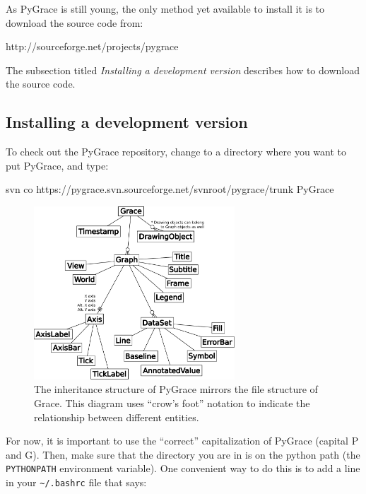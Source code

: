 As PyGrace is still young, the only method yet available to install it
is to download the source code from:

\begin{command}
http://sourceforge.net/projects/pygrace
\end{command}

\noindent
The subsection titled \textit{Installing a development version}
describes how to download the source code.

\subsection*{Installing a development version}

\begin{flushleft}

To check out the PyGrace repository, change to a directory where you
want to put PyGrace, and type:

\begin{command}
svn co https://pygrace.svn.sourceforge.net/svnroot/pygrace/trunk
PyGrace
\end{command}

\begin{figure}[t!]
  \centering
  \includegraphics[width=0.67\textwidth]{crow_diagram.pdf}
  \caption{
%
The inheritance structure of PyGrace mirrors the file structure of
Grace.  This diagram uses ``crow's foot'' notation to indicate the
relationship between different entities.
%
  }
  \label{crowdiagram}
\end{figure}

For now, it is important to use the ``correct'' capitalization of
PyGrace (capital P and G).  Then, make sure that the directory you are
in is on the python path (the {\tt PYTHONPATH} environment variable).
One convenient way to do this is to add a line in your
{\tt \textasciitilde/.bashrc} file that says:


\end{flushleft}
